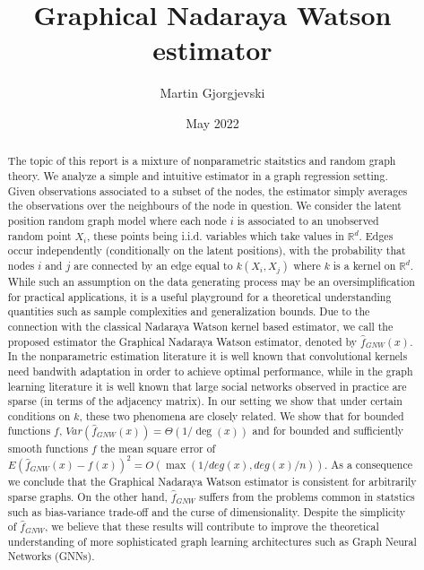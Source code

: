 \documentclass{article}
\title{Graphical Nadaraya Watson estimator}
\author{Martin Gjorgjevski}
\date{May 2022}
\begin{document}
\maketitle
\begin{abstract}
The topic of this report is a mixture of nonparametric staitstics and random graph theory.
We analyze a simple and intuitive estimator in a graph regression setting. Given observations associated to a subset of the nodes, the estimator simply averages the observations over the neighbours of the node in question. We consider the latent position random graph model where each node $i$ is associated to an unobserved random point $X_i$, these points being i.i.d. variables which take values in $\mathbb{R}^d$. Edges  occur independently (conditionally on the latent positions), with the probability  that nodes  $i$ and $j$ are connected by an edge equal to $k(X_i,X_j)$ where $k$ is a kernel on $\mathbb{R}^d$. While such an assumption on the data generating process may be an oversimplification for practical applications, it is a useful playground for a theoretical  understanding quantities such as sample complexities and generalization bounds.
Due to the connection with the classical Nadaraya Watson kernel based estimator, we call the proposed estimator the Graphical Nadaraya Watson estimator, denoted by $\hat{f}_{GNW}(x)$. In the nonparametric estimation literature it is well known that convolutional kernels need bandwith adaptation in order to achieve optimal performance, while in the graph learning literature it is well known that large social networks observed in practice are sparse (in terms of the adjacency matrix). In our setting we show that under certain conditions on $k$, these two phenomena are closely related. We show that for bounded functions $f$, $Var(\hat{f}_{GNW}(x))=\Theta(1/\deg(x))$ and for bounded and sufficiently smooth functions $f$ the mean square error of $E(\hat{f}_{GNW}(x)-f(x))^2=O(\max(1/deg(x),deg(x)/n))$. As a consequence we conclude that the Graphical Nadaraya Watson estimator is consistent for arbitrarily sparse graphs. On the other hand, $\hat{f}_{GNW}$ suffers from the problems common in statstics such as bias-variance trade-off and the curse of dimensionality. Despite the simplicity of $\hat{f}_{GNW}$, we believe that these results will contribute to improve the theoretical understanding of more sophisticated graph learning architectures  such as Graph Neural Networks (GNNs). 
\end{abstract}
\end{document}
